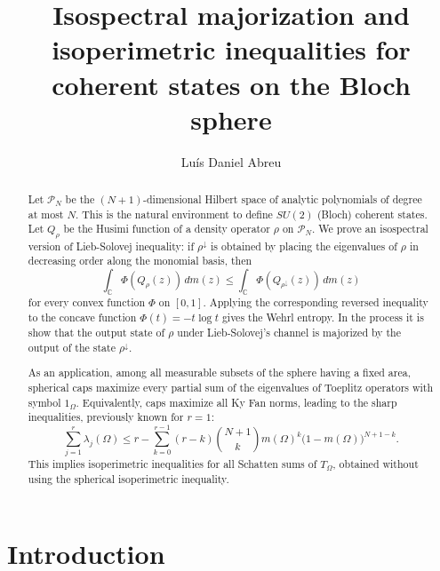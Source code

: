 \documentclass[12pt]{amsart}
\theoremstyle{plain}
\theoremstyle{definition}
\theoremstyle{remark}
\numberwithin{equation}{section}
\newcommand{\1}{\mathbf 1}
\begin{document}
\title[Isospectral minimization and Ky Fan isoperimetry]{\textbf{Isospectral majorization and isoperimetric inequalities for coherent states on the Bloch sphere}}
\author{Lu\'is Daniel Abreu}
\date{}

\begin{abstract}
Let $\mathcal{P}_{N}$ be the $(N+1)$-dimensional Hilbert space of analytic
polynomials of degree at most $N$.
This is the natural environment to define $SU(2)$ (Bloch) coherent states.
Let $Q_{\rho }$ be the Husimi function of a density operator $\rho $ on $%
\mathcal{P}_{N}$. We prove an isospectral version of Lieb-Solovej
inequality: if $\rho ^{\downarrow }$ is obtained by placing the eigenvalues
of $\rho $ in decreasing order along the monomial basis, then 
\begin{equation*}
\int_{\mathbb{C}}\Phi (Q_{\rho }(z))\,dm(z)\leq \int_{\mathbb{C}}\Phi
(Q_{\rho ^{\downarrow }}(z))\,dm(z)
\end{equation*}%
for every convex function $\Phi $ on $[0,1]$. Applying the corresponding
reversed inequality to the concave function $\Phi (t)=-t\log t$ gives the
Wehrl entropy. In the process it is show that the output
state of $\rho $ under Lieb-Solovej's channel is
majorized by the output of the state $\rho
^{\downarrow }$.

As an application, among all measurable subsets of the sphere having a fixed
area, spherical caps maximize every partial sum of the eigenvalues of
Toeplitz operators with symbol $1_{\Omega}$. Equivalently, caps maximize all
Ky Fan norms, leading to the sharp inequalities, previously known for $r=1$:
\begin{equation*}
\sum_{j=1}^{r}\lambda_{j}(\Omega)
\leq
r-\sum_{k=0}^{r-1}(r-k)\binom{N+1}{k}
m(\Omega)^{k}\bigl(1-m(\Omega)\bigr)^{N+1-k}.
\end{equation*}
This implies isoperimetric inequalities for all
Schatten sums of $T_{\Omega}$, obtained without using the spherical isoperimetric inequality.
\end{abstract}

\maketitle

\section{Introduction}
\end{document}
